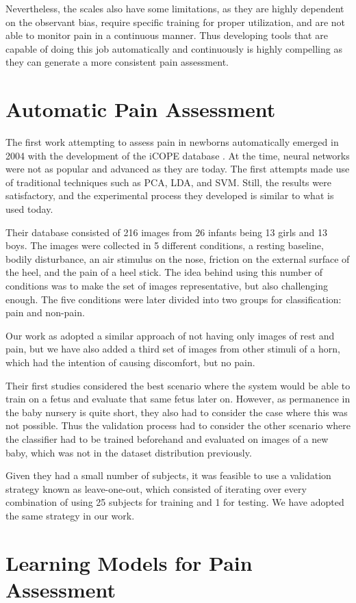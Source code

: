 Nevertheless, the scales also have some limitations, as they are highly dependent on the observant bias, require specific training for proper utilization, and are not able to monitor pain in a continuous manner. Thus developing tools that are capable of doing this job automatically and continuously is highly compelling as they can generate a more consistent pain assessment.

\section{Automatic Pain Assessment}

The first work attempting to assess pain in newborns automatically emerged in 2004 with the development of the iCOPE database \citep{Brahnam2006}. At the time, neural networks were not as popular and advanced as they are today. The first attempts made use of traditional techniques such as PCA, LDA, and SVM. Still, the results were satisfactory, and the experimental process they developed is similar to what is used today. 

Their database consisted of 216 images from 26 infants being 13 girls and 13 boys. The images were collected in 5 different conditions, a resting baseline, bodily disturbance, an air stimulus on the nose, friction on the external surface of the heel, and the pain of a heel stick. The idea behind using this number of conditions was to make the set of images representative, but also challenging enough. The five conditions were later divided into two groups for classification: pain and non-pain.

Our work as adopted a similar approach of not having only images of rest and pain, but we have also added a third set of images from other stimuli of a horn, which had the intention of causing discomfort, but no pain. 

Their first studies considered the best scenario where the system would be able to train on a fetus and evaluate that same fetus later on. However, as permanence in the baby nursery is quite short, they also had to consider the case where this was not possible. Thus the validation process had to consider the other scenario where the classifier had to be trained beforehand and evaluated on images of a new baby, which was not in the dataset distribution previously.

Given they had a small number of subjects, it was feasible to use a validation strategy known as leave-one-out, which consisted of iterating over every combination of using 25 subjects for training and 1 for testing. We have adopted the same strategy in our work.

\section{Learning Models for Pain Assessment}